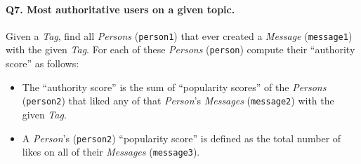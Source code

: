 \paragraph{\textbf{Q7}. Most authoritative users on a given topic.}
Given a \emph{Tag}, find all \emph{Persons} (\texttt{person1}) that ever
created a \emph{Message} (\texttt{message1}) with the given \emph{Tag}.
For each of these \emph{Persons} (\texttt{person}) compute their
``authority score'' as follows:
\begin{itemize}
\tightlist
\item
  The ``authority score'' is the sum of ``popularity scores'' of the
  \emph{Persons} (\texttt{person2}) that liked any of that
  \emph{Person}'s \emph{Messages} (\texttt{message2}) with the given
  \emph{Tag}.
\item
  A \emph{Person}'s (\texttt{person2}) ``popularity score'' is defined
  as the total number of likes on all of their \emph{Messages}
  (\texttt{message3}).
\end{itemize}
